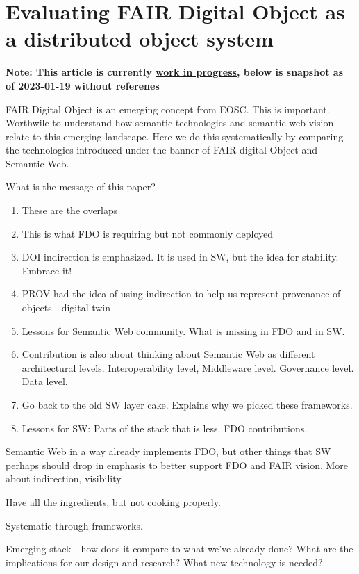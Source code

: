 \section{Evaluating FAIR Digital Object as a distributed object system}

\textbf{Note: This article is currently \href{https://stain.github.io/2022-fdo-paper/}{work in
progress}, below is snapshot as of 2023-01-19 without referenes}


FAIR Digital Object is an emerging concept from EOSC. This is important.
Worthwile to understand how semantic technologies and semantic web
vision relate to this emerging landscape. Here we do this systematically
by comparing the technologies introduced under the banner of FAIR
digital Object and Semantic Web.

What is the message of this paper?

\begin{enumerate}
\def\labelenumi{\arabic{enumi}.}
\tightlist
\item
  These are the overlaps
\item
  This is what FDO is requiring but not commonly deployed
\item
  DOI indirection is emphasized. It is used in SW, but the idea for
  stability. Embrace it!
\item
  PROV had the idea of using indirection to help us represent provenance
  of objects - digital twin
\item
  Lessons for Semantic Web community. What is missing in FDO and in SW.
\item
  Contribution is also about thinking about Semantic Web as different
  architectural levels. Interoperability level, Middleware level.
  Governance level. Data level.
\item
  Go back to the old SW layer cake. Explains why we picked these
  frameworks.
\item
  Lessons for SW: Parts of the stack that is less. FDO contributions.
\end{enumerate}

Semantic Web in a way already implements FDO, but other things that SW
perhaps should drop in emphasis to better support FDO and FAIR vision.
More about indirection, visibility.

Have all the ingredients, but not cooking properly.

Systematic through frameworks.

Emerging stack - how does it compare to what we've already done? What
are the implications for our design and research? What new technology is
needed?

